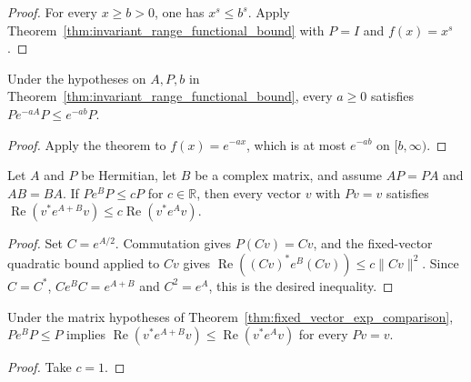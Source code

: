 \begin{proof}
    \leanok
    For every $x\ge b>0$, one has $x^s\le b^s$.
    Apply Theorem~\ref{thm:invariant_range_functional_bound} with
    $P=I$ and $f(x)=x^s$.
\end{proof}

\begin{theorem}
  \label{thm:invariant_range_negative_exp}
  \leanok
  Under the hypotheses on $A,P,b$ in
  Theorem~\ref{thm:invariant_range_functional_bound}, every $a\geq0$
  satisfies $Pe^{-aA}P\leq e^{-ab}P$.
\end{theorem}
\begin{proof}
  \leanok
  Apply the theorem to $f(x)=e^{-ax}$, which is at most $e^{-ab}$
  on $[b,\infty)$.
\end{proof}

\begin{theorem}
  \label{thm:fixed_vector_exp_comparison}
  \leanok
  Let $A$ and $P$ be Hermitian, let $B$ be a complex matrix, and assume
  $AP=PA$ and $AB=BA$. If $Pe^BP\leq cP$ for $c\in\mathbb R$, then
  every vector $v$ with $Pv=v$ satisfies
  $\operatorname{Re}(v^*e^{A+B}v)\leq c\operatorname{Re}(v^*e^Av)$.
\end{theorem}
\begin{proof}
  \leanok
  Set $C=e^{A/2}$. Commutation gives $P(Cv)=Cv$, and the fixed-vector
  quadratic bound applied to $Cv$ gives
  $\operatorname{Re}((Cv)^*e^B(Cv))\leq c\|Cv\|^2$.
  Since $C=C^*$, $Ce^BC=e^{A+B}$ and $C^2=e^A$, this is the desired
  inequality.
\end{proof}

\begin{theorem}
  \label{thm:fixed_vector_exp_contraction}
  \leanok
  Under the matrix hypotheses of Theorem~\ref{thm:fixed_vector_exp_comparison},
  $Pe^BP\leq P$ implies
  $\operatorname{Re}(v^*e^{A+B}v)\leq\operatorname{Re}(v^*e^Av)$
  for every $Pv=v$.
\end{theorem}
\begin{proof}
  \leanok
  Take $c=1$.
\end{proof}

